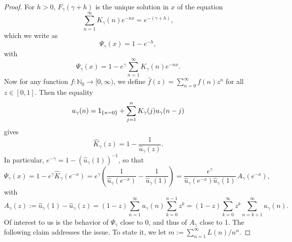 \documentclass[11pt]{article}
\theoremstyle{definition}
\numberwithin{equation}{section}
\numberwithin{figure}{section}
\numberwithin{table}{section}
\newcommand{\bbN}{{\ensuremath{\mathbb N}}}
\newcommand{\ga}{\alpha}
\newcommand{\gga}{\gamma}
\newcommand{\ind}{{\sf 1}}
\newcommand{\hK}{\hat K}
\begin{document}
\begin{proof}
For $h > 0$, $F_\gga(\gga + h)$ is the unique solution in $x$ of the equation
\begin{equation}
\sum_{n=1}^\infty K_\gga(n) e^{- n x} = e^{- (\gga + h)},
\end{equation}
which we write as
\begin{equation}\label{FreeEnergyEquation}
\Psi_\gga(x) = 1 - e^{- h},
\end{equation}
with
\begin{equation}
\Psi_\gga(x) = 1 - e^\gga \sum_{n=1}^\infty K_\gga(n) e^{- n x}.
\end{equation}
Now for any function $f : \bbN_0 \to [0,\infty)$, we define $\hat f(z) = \sum_{n=0}^\infty f(n) z^n$ for all $z \in [0,1]$. Then the equality
\begin{equation}
u_\gga(n) = \ind_{\{n = 0\}} + \sum_{j=1}^n K_\gga(j) u_\gga(n-j)
\end{equation}
gives
\begin{equation}
\hK_\gga(z) = 1 - \frac{1}{\hat u_\gga(z)}.
\end{equation}
In particular, $e^{- \gga} = 1 - (\hat u_\gga(1))^{-1}$, so that
\begin{equation}\label{PsiAndA}
\Psi_\gga(x) = 1 - e^\gga \hK_\gga(e^{- x}) = e^\gga \left(\frac{1}{\hat u_\gga(e^{- x})} - \frac{1}{\hat u_\gga(1)} \right) = \frac{e^\gga}{\hat u_\gga(e^{- x}) \hat u_\gga(1)} \, A_\gga(e^{- x}),
\end{equation}
with
\begin{equation}
A_\gga(z) := \hat u_\gga(1) - \hat u_\gga(z) = (1 - z) \sum_{n=1}^\infty u_\gga(n) \sum_{k=0}^{n-1} z^k = (1 - z) \sum_{k=0}^\infty z^k \sum_{n=k+1}^\infty u_\gga(n).
\end{equation}
Of interest to us is the behavior of $\Psi_\gga$ close to 0, and thus of $A_\gga$ close to 1. The following claim addresses the issue. To state it, we let $m := \sum_{n=1}^\infty L(n)/n^\ga$.


\end{proof}
\end{document}
